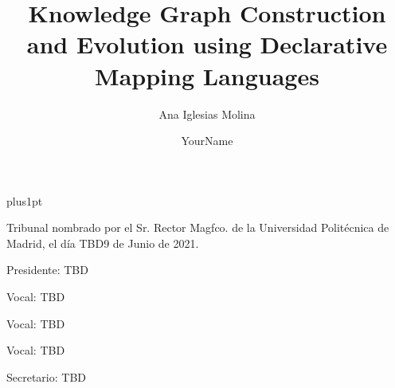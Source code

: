 \documentclass[twoside,11pt,table,xcdraw]{Latex/Classes/PhDthesisPSnPDF}
\title{Knowledge Graph Construction and Evolution using Declarative Mapping Languages}
\author{{\hspace{7mm} Ana Iglesias Molina}}
\author{YourName}
\newcounter{captionedlistingcounter}
\begin{document}


\renewcommand\baselinestretch{1.2}
\baselineskip=18pt plus1pt




\newcommand{\attention}[1]{{\color{red}\textbf{#1}}}

\renewcommand\appendixname{ANNEX}


\frontmatter
\maketitle  %




\pagestyle{plain}
\cleardoublepage
\pagestyle{plain}


\noindent Tribunal nombrado por el Sr. Rector Magfco. de la Universidad Polit\'{e}cnica de
Madrid, el d\'{i}a TBD9 de Junio de 2021. %

\vspace{10mm}
Presidente:\hspace{0.3mm} TBD%

\vspace{5mm}
Vocal: \hspace{6.7mm} TBD%

\vspace{5mm}
Vocal: \hspace{6.7mm} TBD%

\vspace{5mm}
Vocal: \hspace{6.7mm} TBD%


\vspace{5mm}
Secretario:\hspace{0.67mm} TBD%
\end{document}

